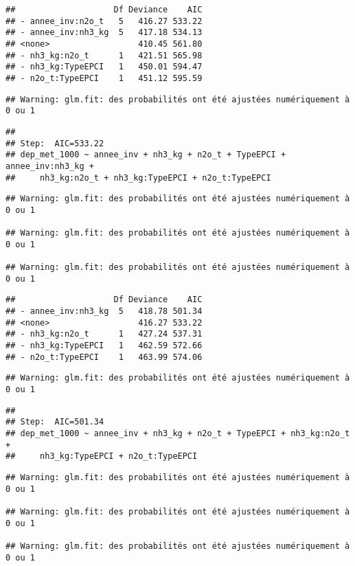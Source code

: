 \documentclass[
]{article}
\begin{document}
\begin{verbatim}
##                    Df Deviance    AIC
## - annee_inv:n2o_t   5   416.27 533.22
## - annee_inv:nh3_kg  5   417.18 534.13
## <none>                  410.45 561.80
## - nh3_kg:n2o_t      1   421.51 565.98
## - nh3_kg:TypeEPCI   1   450.01 594.47
## - n2o_t:TypeEPCI    1   451.12 595.59
\end{verbatim}

\begin{verbatim}
## Warning: glm.fit: des probabilités ont été ajustées numériquement à 0 ou 1
\end{verbatim}

\begin{verbatim}
## 
## Step:  AIC=533.22
## dep_met_1000 ~ annee_inv + nh3_kg + n2o_t + TypeEPCI + annee_inv:nh3_kg + 
##     nh3_kg:n2o_t + nh3_kg:TypeEPCI + n2o_t:TypeEPCI
\end{verbatim}

\begin{verbatim}
## Warning: glm.fit: des probabilités ont été ajustées numériquement à 0 ou 1

## Warning: glm.fit: des probabilités ont été ajustées numériquement à 0 ou 1

## Warning: glm.fit: des probabilités ont été ajustées numériquement à 0 ou 1
\end{verbatim}

\begin{verbatim}
##                    Df Deviance    AIC
## - annee_inv:nh3_kg  5   418.78 501.34
## <none>                  416.27 533.22
## - nh3_kg:n2o_t      1   427.24 537.31
## - nh3_kg:TypeEPCI   1   462.59 572.66
## - n2o_t:TypeEPCI    1   463.99 574.06
\end{verbatim}

\begin{verbatim}
## Warning: glm.fit: des probabilités ont été ajustées numériquement à 0 ou 1
\end{verbatim}

\begin{verbatim}
## 
## Step:  AIC=501.34
## dep_met_1000 ~ annee_inv + nh3_kg + n2o_t + TypeEPCI + nh3_kg:n2o_t + 
##     nh3_kg:TypeEPCI + n2o_t:TypeEPCI
\end{verbatim}

\begin{verbatim}
## Warning: glm.fit: des probabilités ont été ajustées numériquement à 0 ou 1

## Warning: glm.fit: des probabilités ont été ajustées numériquement à 0 ou 1

## Warning: glm.fit: des probabilités ont été ajustées numériquement à 0 ou 1
\end{verbatim}
\end{document}
